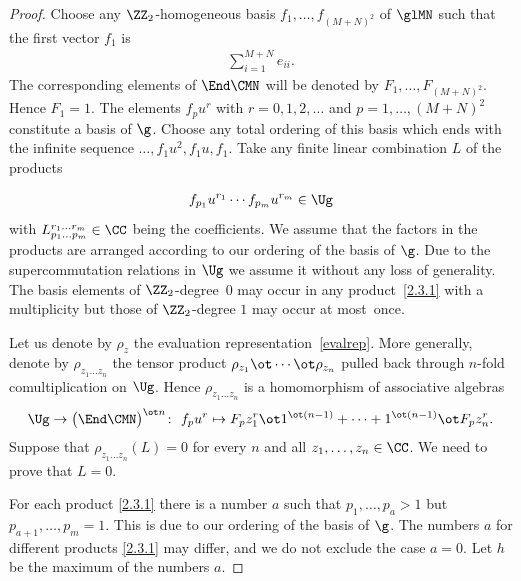\begin{proof}
Choose any $\ZZ_2 $-homogeneous
basis $f_1,\dots, f_{(M+N)^2}$ of $\glMN$
such that the first vector $f_1$ is
\begin{gather}\label{esum}
\sum_{i=1}^{M+N}e_{ii} .
\end{gather}
The corresponding elements of $\End\CMN$
will be denoted by $F_1,\dots, F_{(M+N)^2} $.
Hence $F_1=1 $.
The elements $f_{p} u^{r}$
with $r=0 ,1 ,2 , \dots$
and $p=1 ,\dots, (M+N)^2$ constitute a basis of $\g $.
Choose any total ordering of this basis which ends with the
infinite sequence
$\dots , f_1 u^{2}, f_1 u , f_1$.
Take any finite linear combination $L$ of the products{\samepage
\begin{gather}\label{2.3.1}
f_{p_1}u^{r_1}\cdots f_{p_m}u^{r_m}\in\Ug
\end{gather}
with $L_{p_1\dots p_m}^{r_1\dots r_m}\in\CC$
being the coefficients.
We assume that the factors in the products are
arranged according to our ordering of the basis of $\g $.
Due to the supercommutation relations in $\Ug$
we assume it without any loss of generality.
The basis elements of $\ZZ_2 $-degree~$0$
may occur in any product~\eqref{2.3.1} with a multiplicity
but those of $\ZZ_2 $-degree $1$ may occur at most~once.

}

Let us denote by $\rho_z$ the evaluation representation~\eqref{evalrep}.
More generally, denote by $\rho_{z_1\dots z_n}$ the tensor product
$\rho_{z_1}\ot\cdots\ot\rho_{z_n}$
pulled back through $n $-fold comultiplication on $\Ug $.
Hence $\rho_{z_1\dots z_n}$ is a homomorphism of
associative algebras
\begin{gather*}
\Ug\to\big(\End\CMN\big)^{\ot n}\colon \
f_{p} u^{r}\mapsto
F_{p} z_1^{r}\ot1^{\ot (n-1)}+\dots+
1^{\ot (n-1)}\ot F_{p} z_n^{r} .
\end{gather*}
Suppose that $\rho_{z_1\dots z_n}(L)=0$ for every $n$
and all $z_1,\dots, z_n\in\CC $.
We need to prove that $L=0 $.

For each product \eqref{2.3.1} there is a number $a$ such that
$p_1,\dots, p_{a}>1$ but $p_{a+1} ,\dots, p_m=1 $.
This is due to our ordering of the basis of $\g $.
The numbers $a$ for different products
\eqref{2.3.1} may differ, and we do not exclude the case $a=0$.
Let $h$ be the maximum of the numbers $a $.


\end{proof}
